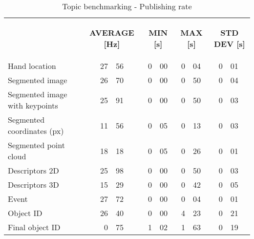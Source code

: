 \begin{table}[H]
\centering
\begin{tabular} {l r@{.}l r@{.}l r@{.}l  r@{.}l  }
\toprule
\addlinespace[3mm]
   \multicolumn{1}{c}{\begin{center}\textbf{TOPIC}\end{center}} &
   \multicolumn{2}{c}{\begin{center}\textbf{\hspace*{-0.7cm}AVERAGE [Hz]}\end{center}} &
   \multicolumn{2}{c}{\begin{center}\textbf{MIN [s]}\end{center}} &
   \multicolumn{2}{c}{\begin{center}\textbf{MAX [s]}\end{center}} &
   \multicolumn{2}{c}{\begin{center}\textbf{STD DEV [s]}\end{center}} &\\

\addlinespace[-3mm]
\midrule
 Hand location & 27&56	&	0&00	&	0&04	&  \hspace*{0.5cm}	0&01 \\
 Segmented  image &  26&70	&	0&00	&	0&50	&	0&04\\
 Segmented  image  with  keypoints & 25&91	& 	0&00	&	0&50	&	0&03 \\
 Segmented  coordinates  (px) & 11&56 	&	0&05	&	0&13	&	0&03\\
 Segmented  point  cloud & 18&18 	&	0&05	&	0&26	&	0&01\\
 Descriptors  2D & 25&98 	&	0&00	&	0&50	&	0&03\\
 Descriptors  3D & 15&29 	&	0&00	&	0&42	&	0&05\\
 Event & 27&72  	&		0&00	&	0&04	&	0&01\\
 Object ID & 26&40 		&	0&00	&	4&23	&	0&21\\
 Final  object  ID & 0&75 	&	1&02	&	1&63	&	0&19\\
\bottomrule
\end{tabular}
\caption[Topic benchmarking - Publishing rate]{Topic benchmarking - Publishing rate}
\label{hz}
\end{table}



